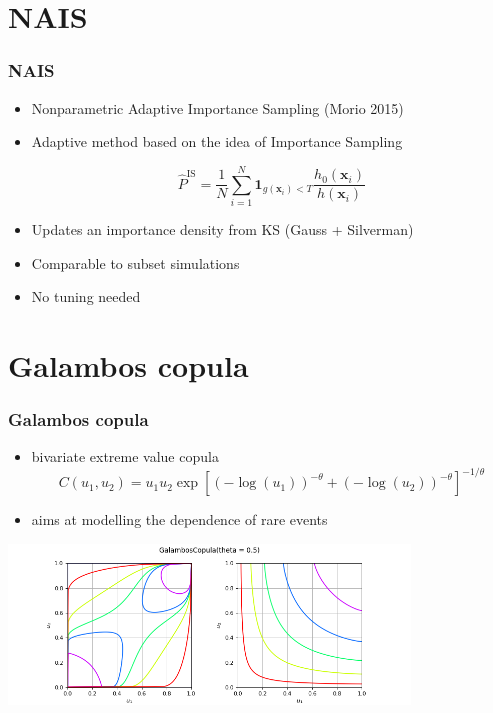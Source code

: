 \documentclass[aspectratio=169]{beamer}
\begin{document}

\section{NAIS}


\begin{frame}[containsverbatim]
\frametitle{NAIS}

\begin{itemize}
\item Nonparametric Adaptive Importance Sampling (Morio 2015)

\item Adaptive method based on the idea of Importance Sampling

$$
\widehat{P}^\text{IS}=\frac{1}{N} \sum_{i=1}^{N} {\mathbf{1}}_{g(\mathbf{x}_i)<T} \frac{h_0(\mathbf{x}_i)}{h(\mathbf{x}_i)}
$$

\item Updates an importance density from KS (Gauss + Silverman)

\item Comparable to subset simulations

\item No tuning needed
\end{itemize}


\end{frame}



\section{Galambos copula}


\begin{frame}
\frametitle{Galambos copula}

\begin{itemize}
\item bivariate extreme value copula
$$ C(u_1, u_2) = u_1u_2\exp\left[(-\log(u_1))^{-\theta} + (-\log(u_2))^{-\theta}\right]^{-1/\theta} $$
\item aims at modelling the dependence of rare events
\end{itemize}

\begin{center}
\includegraphics[width=0.8\textwidth]{figures/openturns-GalambosCopula-1.png}
\end{center}

\end{frame}
\end{document}
